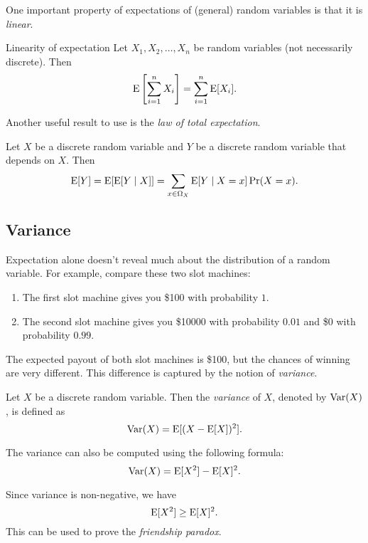 \documentclass{article}
\begin{document}
One important property of expectations of (general) random variables is that it is \emph{linear}.

\begin{theorem}{Linearity of expectation}
  Let $X_1, X_2, \ldots, X_n$ be random variables (not necessarily discrete).
  Then
  \[
    \operatorname{E}\left[\sum\limits_{i = 1}^n X_i\right] = \sum\limits_{i = 1}^n \operatorname{E}[X_i].
  \]
\end{theorem}

Another useful result to use is the \emph{law of total expectation}.

\begin{theorem}
  Let $X$ be a discrete random variable and $Y$ be a discrete random variable that depends on $X$.
  Then
  \[
    \operatorname{E}[Y] = \operatorname{E}[\operatorname{E}[Y \mid X]] = \sum_{x \in \Omega_X} \operatorname{E}[Y \mid X = x] \Pr(X = x).
  \]
\end{theorem}

\subsection{Variance}

Expectation alone doesn't reveal much about the distribution of a random variable.
For example, compare these two slot machines:
\begin{enumerate}
  \item The first slot machine gives you \$100 with probability $1$.
  \item The second slot machine gives you \$10000 with probability $0.01$ and \$0 with probability $0.99$.
\end{enumerate}
The expected payout of both slot machines is \$100, but the chances of winning are very different.
This difference is captured by the notion of \emph{variance}.

\begin{definition}
  Let $X$ be a discrete random variable.
  Then the \emph{variance} of $X$, denoted by $\operatorname{Var}(X)$, is defined as
  \[
    \operatorname{Var}(X) = \operatorname{E}[(X - \operatorname{E}[X])^2].
  \]
\end{definition}

\begin{remark}
  The variance can also be computed using the following formula:
  \[
    \operatorname{Var}(X) = \operatorname{E}[X^2] - \operatorname{E}[X]^2.
  \]
\end{remark}

\begin{remark}
  Since variance is non-negative, we have
  \[
    \operatorname{E}[X^2] \geq \operatorname{E}[X]^2.
  \]
  This can be used to prove the \emph{friendship paradox}.
\end{remark}
\end{document}
